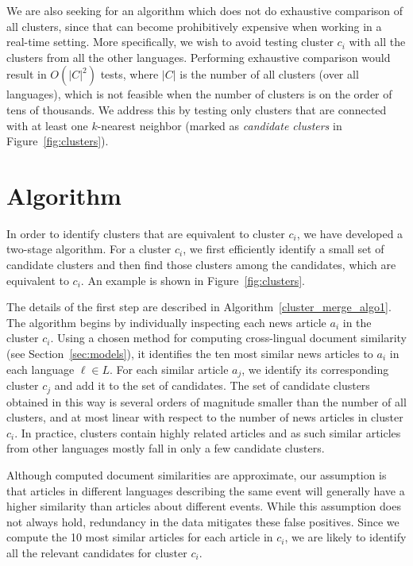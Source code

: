 We are also seeking for an algorithm which does not do exhaustive comparison of all clusters, 
since that can become prohibitively expensive when working in a real-time setting. More specifically, 
we wish to avoid testing cluster $c_i$ with all the clusters from all the other languages. 
Performing exhaustive comparison would result in $O(|C|^2)$ tests, where $|C|$ is the number of all 
clusters (over all languages), which is not feasible when the number of clusters is on the order of tens 
of thousands. We address this by testing only clusters that are connected with at least one $k$-nearest 
neighbor (marked as \emph{candidate clusters} in Figure~\ref{fig:clusters}).

\section{Algorithm}\label{algo:features}

In order to identify clusters that are equivalent to cluster $c_i$, we have developed a 
two-stage algorithm. For a cluster $c_i$, we first efficiently identify a small set of 
candidate clusters and then find those clusters among the candidates, which are 
equivalent to $c_i$. An example is  shown in  Figure~\ref{fig:clusters}.

The details of the first step are described in Algorithm~\ref{cluster_merge_algo1}. The algorithm 
begins by individually inspecting each news article $a_i$ in the cluster $c_i$. Using a chosen 
method for computing cross-lingual document similarity (see Section~\ref{sec:models}), it identifies 
the ten most similar news articles to $a_i$ in each language $\ell \in L$. For each similar 
article $a_j$, we identify its corresponding  cluster $c_j$ and add it to the set of candidates. 
The set of candidate clusters obtained in this way is several orders of magnitude smaller than the 
number of all clusters, and at most linear with respect to the number of news articles in 
cluster $c_i$. In practice, clusters contain highly related articles and as such similar 
articles from other languages mostly fall in only a few candidate clusters.

Although computed document similarities are approximate, our  assumption is that articles 
in different languages describing the same event will generally have a higher similarity 
than articles about different events. While this assumption does not always hold, redundancy 
in the data mitigates these false positives. Since we compute the 10 most similar articles 
for each article in $c_i$, we are likely to identify all the relevant candidates for cluster $c_i$.

